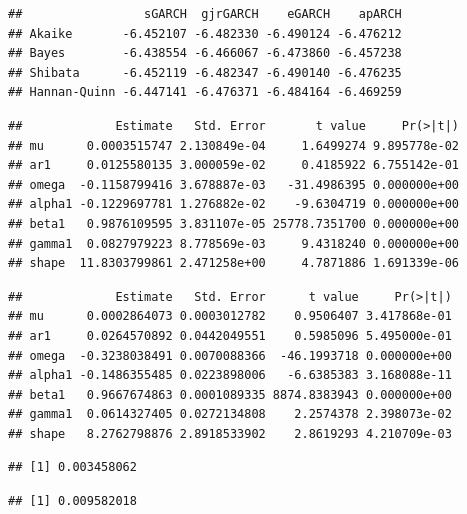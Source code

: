 \documentclass[11pt,preprint, authoryear]{elsarticle}
\numberwithin{equation}{section}
\numberwithin{figure}{section}
\numberwithin{table}{section}
\begin{document}
\begin{verbatim}
##                 sGARCH  gjrGARCH    eGARCH    apARCH
## Akaike       -6.452107 -6.482330 -6.490124 -6.476212
## Bayes        -6.438554 -6.466067 -6.473860 -6.457238
## Shibata      -6.452119 -6.482347 -6.490140 -6.476235
## Hannan-Quinn -6.447141 -6.476371 -6.484164 -6.469259
\end{verbatim}

\begin{verbatim}
##             Estimate   Std. Error       t value     Pr(>|t|)
## mu      0.0003515747 2.130849e-04     1.6499274 9.895778e-02
## ar1     0.0125580135 3.000059e-02     0.4185922 6.755142e-01
## omega  -0.1158799416 3.678887e-03   -31.4986395 0.000000e+00
## alpha1 -0.1229697781 1.276882e-02    -9.6304719 0.000000e+00
## beta1   0.9876109595 3.831107e-05 25778.7351700 0.000000e+00
## gamma1  0.0827979223 8.778569e-03     9.4318240 0.000000e+00
## shape  11.8303799861 2.471258e+00     4.7871886 1.691339e-06
\end{verbatim}

\begin{verbatim}
##             Estimate   Std. Error      t value     Pr(>|t|)
## mu      0.0002864073 0.0003012782    0.9506407 3.417868e-01
## ar1     0.0264570892 0.0442049551    0.5985096 5.495000e-01
## omega  -0.3238038491 0.0070088366  -46.1993718 0.000000e+00
## alpha1 -0.1486355485 0.0223898006   -6.6385383 3.168088e-11
## beta1   0.9667674863 0.0001089335 8874.8383943 0.000000e+00
## gamma1  0.0614327405 0.0272134808    2.2574378 2.398073e-02
## shape   8.2762798876 2.8918533902    2.8619293 4.210709e-03
\end{verbatim}

\begin{verbatim}
## [1] 0.003458062
\end{verbatim}

\begin{verbatim}
## [1] 0.009582018
\end{verbatim}
\end{document}
